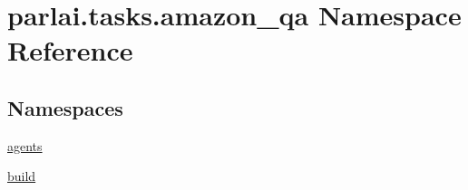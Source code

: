 \hypertarget{namespaceparlai_1_1tasks_1_1amazon__qa}{}\section{parlai.\+tasks.\+amazon\+\_\+qa Namespace Reference}
\label{namespaceparlai_1_1tasks_1_1amazon__qa}
\subsection*{Namespaces}
\begin{DoxyCompactItemize}
\item 
 \hyperlink{namespaceparlai_1_1tasks_1_1amazon__qa_1_1agents}{agents}
\item 
 \hyperlink{namespaceparlai_1_1tasks_1_1amazon__qa_1_1build}{build}
\end{DoxyCompactItemize}
